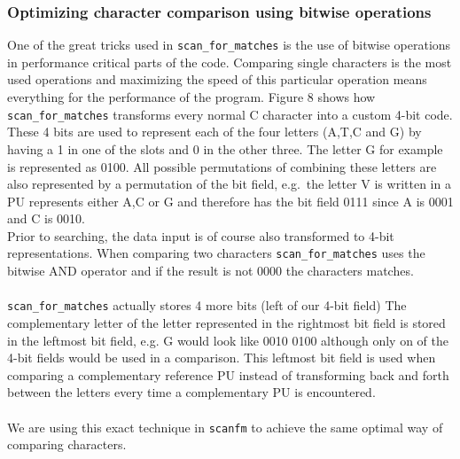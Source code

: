 \documentclass[12pt]{article}
\newcommand{\scm}{\texttt{scan\_for\_matches} }
\newcommand{\sfm}{\texttt{scanfm} }
\newcommand{\pu}{PU }
\begin{document}
\subsubsection{Optimizing character comparison using bitwise operations}
One of the great tricks used in \scm is the use of bitwise operations in performance critical parts of the code.
Comparing single characters is the most used operations and maximizing the speed of this particular operation 
means everything for the performance of the program. Figure 8 shows how \scm transforms every normal C character into
a custom 4-bit code. These 4 bits are used to represent each of the four letters (A,T,C and G) by having a 1 in one of
the slots and 0 in the other three. The letter G for example is represented as 0100. All possible permutations of 
combining these letters are also represented by a permutation of the bit field, e.g.\ the letter V is written in a \pu 
represents either A,C or G and therefore has the bit field 0111 since A is 0001 and C is 0010. \\
Prior to searching, the data input is of course also transformed to 4-bit representations.
When comparing two characters \scm uses the bitwise AND operator and if the result is not 0000 the characters matches. \\ \\
\scm actually stores 4 more bits (left of our 4-bit field) The complementary letter of the letter represented in the rightmost
bit field is stored in the leftmost bit field, e.g. G would look like 0010 0100 although only on of the 4-bit fields would
be used in a comparison. This leftmost bit field is used when comparing a complementary reference \pu instead
of transforming back and forth between the letters every time a complementary \pu is encountered. \\ \\
We are using this exact technique in \sfm to achieve the same optimal way of comparing characters.
\end{document}
